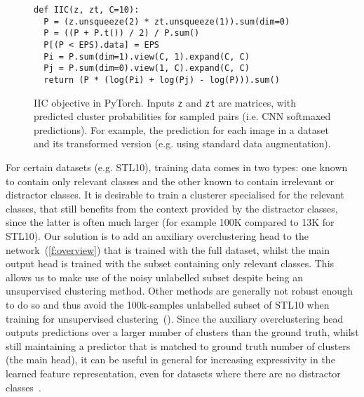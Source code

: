 \documentclass[10pt,twocolumn,letterpaper]{article}
\makeatletter
\newcommand{\methodnameshort}{IIC\xspace}
\renewcommand{\paragraph}{\@startsection{paragraph}{4}{\z@}{0.5em}{-1em}{\normalfont\normalsize\bfseries}}
\makeatother
\begin{document}



\begin{figure}[t]


\begin{lstlisting}[style=mystyle]
def IIC(z, zt, C=10):
  P = (z.unsqueeze(2) * zt.unsqueeze(1)).sum(dim=0)
  P = ((P + P.t()) / 2) / P.sum()
  P[(P < EPS).data] = EPS
  Pi = P.sum(dim=1).view(C, 1).expand(C, C)
  Pj = P.sum(dim=0).view(1, C).expand(C, C)
  return (P * (log(Pi) + log(Pj) - log(P))).sum()
\end{lstlisting}


\caption{\label{f:code} \methodnameshort objective in PyTorch. Inputs \texttt{z} and \texttt{zt} are  matrices, with  predicted cluster probabilities for  sampled pairs (i.e. CNN softmaxed predictions). For example, the prediction for each image in a dataset and its transformed version (e.g. using standard data augmentation).}
\end{figure} 


\paragraph{Auxiliary overclustering.}\label{s:overcluster}

For certain datasets (e.g. STL10), training data comes in two types: one known to contain only relevant classes and the other known to contain irrelevant or distractor classes. It is desirable to train a clusterer specialised for the relevant classes, that still benefits from the context provided by the distractor classes, since the latter is often much larger (for example 100K compared to 13K for STL10).
Our solution is to add an auxiliary overclustering head to the network~(\cref{f:overview}) that is trained with the full dataset, whilst the main output head is trained with the subset containing only relevant classes.
This allows us to make use of the noisy unlabelled subset despite being an unsupervised clustering method. 
Other methods are generally not robust enough to do so and thus avoid the 100k-samples unlabelled subset of STL10 when training for unsupervised clustering~(\cite{chang2017deep, haeusser2018associative,xie2016unsupervised}).
Since the auxiliary overclustering head outputs predictions over a larger number of clusters than the ground truth, whilst still maintaining a predictor that is matched to ground truth number of clusters (the main head), it can be useful in general for increasing expressivity in the learned feature representation, even for datasets where there are no distractor classes~\cite{caron2018deep}.
\end{document}
